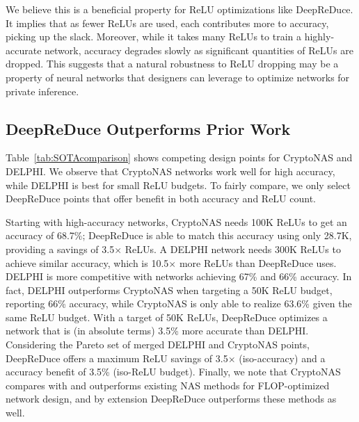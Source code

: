 We believe this is a beneficial property for ReLU optimizations like DeepReDuce.
It implies that as fewer ReLUs are used, each contributes more to accuracy,
picking up the slack.
Moreover, while it takes many ReLUs to train a highly-accurate network,
accuracy degrades slowly as significant quantities of ReLUs are dropped.
This suggests that a natural robustness to ReLU dropping may be a property of neural networks
that designers can leverage to optimize networks for private inference.






\subsection{DeepReDuce Outperforms Prior Work}
Table~\ref{tab:SOTAcomparison} shows competing design points
for CryptoNAS and DELPHI.
We observe that CryptoNAS networks work well for high accuracy,
while DELPHI is best for small ReLU budgets.
To fairly compare, we only select DeepReDuce points that
offer benefit in both accuracy and ReLU count.

Starting with high-accuracy networks,
CryptoNAS needs 100K ReLUs to get an accuracy of 68.7\%;
DeepReDuce is able to match this accuracy using only 28.7K,
providing a savings of 3.5$\times$ ReLUs.
A DELPHI network needs 300K ReLUs to achieve similar accuracy,
which is 10.5$\times$ more ReLUs than DeepReDuce uses.
DELPHI is more competitive with networks achieving 67\% and 66\% accuracy.
In fact, DELPHI outperforms CryptoNAS when targeting a 50K ReLU budget,
reporting 66\% accuracy,
while CryptoNAS is only able to realize 63.6\% given the same ReLU budget.
With a target of 50K ReLUs, DeepReDuce optimizes a network that is 
(in absolute terms) 3.5\% more accurate than DELPHI.
Considering the Pareto set of merged DELPHI and CryptoNAS points,
DeepReDuce offers a maximum ReLU savings of 3.5$\times$ (iso-accuracy)
and a accuracy benefit of 3.5\% (iso-ReLU budget).
Finally, we note that CryptoNAS compares with and outperforms existing NAS methods for FLOP-optimized network design, and by extension DeepReDuce outperforms these methods as well.


